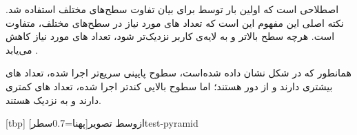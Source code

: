 
 اصطلاحی است که اولین بار توسط 
برای بیان تفاوت سطح‌های مختلف  استفاده شد. نکته اصلی این
مفهوم این است که تعداد ‌های مورد نیاز در سطح‌های مختلف، متفاوت
است. هرچه سطح  بالاتر و به لایه‌ی کاربر نزدیک‌تر شود، تعداد
‌های مورد نیاز کاهش می‌یابد .

همانطور که در شکل  نشان داده شده‌است، سطوح
پایینی  سریع‌تر اجرا شده، تعداد ‌های بیشتری دارند
و از  دور هستند؛ اما سطوح بالایی کندتر اجرا شده،
تعداد های کمتری دارند و به  نزدیک هستند.


[tbp]
‌ازوسط
‌تصویر[پهنا=0.7‌سطر]{test-pyramid}

